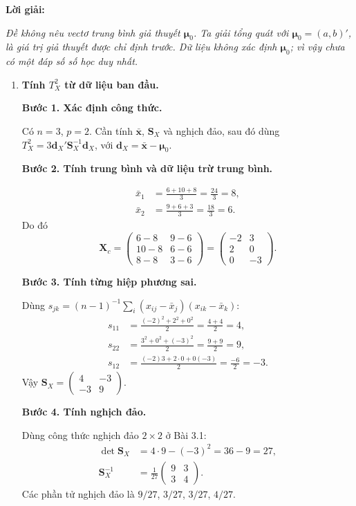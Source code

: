\documentclass[11pt,a4paper]{article}
\renewcommand{\boldsymbol}[1]{\symbf{#1}}
\newenvironment{solution}{%
  \par\medskip\noindent\textbf{Lời giải:}\par\nobreak\smallskip\noindent\ignorespaces
}{\par}
\newcommand{\step}[2]{\par\medskip\noindent\textbf{Bước #1. #2}\par\nopagebreak[4]\smallskip\noindent}
\begin{document}
\begin{solution}
\textit{Đề không nêu vectơ trung bình giả thuyết $\boldsymbol{\mu}_0$.
Ta giải tổng quát với $\boldsymbol{\mu}_0=(a,b)'$, là giá trị giả thuyết
được chỉ định trước. Dữ liệu không xác định $\boldsymbol{\mu}_0$;
vì vậy chưa có một đáp số số học duy nhất.}
\begin{enumerate}[label=\textbf{\alph*)}]
\item \textbf{Tính $T_X^2$ từ dữ liệu ban đầu.}\par\nopagebreak[4]
\step{1}{Xác định công thức.}
Có $n=3$, $p=2$. Cần tính $\bar{\mathbf{x}}$, $\mathbf{S}_X$ và nghịch đảo,
sau đó dùng $T_X^2=3\mathbf{d}_X'\mathbf{S}_X^{-1}\mathbf{d}_X$,
với $\mathbf{d}_X=\bar{\mathbf{x}}-\boldsymbol{\mu}_0$.
\step{2}{Tính trung bình và dữ liệu trừ trung bình.}
\begin{align*}
\bar{x}_1&=\frac{6+10+8}{3}=\frac{24}{3}=8,\\
\bar{x}_2&=\frac{9+6+3}{3}=\frac{18}{3}=6.
\end{align*}
Do đó
\[
\mathbf{X}_c=\begin{pmatrix}6-8&9-6\\10-8&6-6\\8-8&3-6\end{pmatrix}
=\begin{pmatrix}-2&3\\2&0\\0&-3\end{pmatrix}.
\]
\step{3}{Tính từng hiệp phương sai.}
Dùng $s_{jk}=(n-1)^{-1}\sum_i(x_{ij}-\bar{x}_j)(x_{ik}-\bar{x}_k)$:
\begin{align*}
s_{11}&=\frac{(-2)^2+2^2+0^2}{2}=\frac{4+4}{2}=4,\\
s_{22}&=\frac{3^2+0^2+(-3)^2}{2}=\frac{9+9}{2}=9,\\
s_{12}&=\frac{(-2)3+2\cdot0+0(-3)}{2}=\frac{-6}{2}=-3.
\end{align*}
Vậy $\mathbf{S}_X=\begin{pmatrix}4&-3\\-3&9\end{pmatrix}$.
\step{4}{Tính nghịch đảo.}
Dùng công thức nghịch đảo $2\times2$ ở Bài 3.1:
\begin{align*}
\det\mathbf{S}_X&=4\cdot9-(-3)^2=36-9=27,\\
\mathbf{S}_X^{-1}&=\frac1{27}\begin{pmatrix}9&3\\3&4\end{pmatrix}.
\end{align*}
Các phần tử nghịch đảo là $9/27$, $3/27$, $3/27$, $4/27$.

\end{enumerate}
\end{solution}
\end{document}
